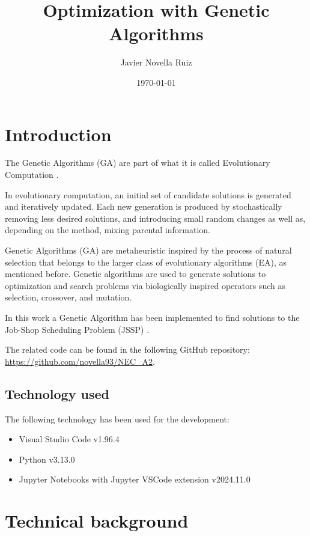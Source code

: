 \documentclass[11pt, a4paper]{article}
\title{Optimization with Genetic Algorithms}
\author{Javier Novella Ruiz}
\date{\today}
\begin{document}


\tableofcontents

\newpage

\section{Introduction}

The Genetic Algorithms (GA) \cite{WikipediaGA} are part of what it is called Evolutionary Computation \cite{WikipediaEC}.

\vspace{1em} In evolutionary computation, an initial set of candidate solutions is generated and iteratively updated. Each 
new generation is produced by stochastically removing less desired solutions, and introducing small random changes as well 
as, depending on the method, mixing parental information.

\vspace{1em} Genetic Algorithms (GA) are metaheuristic inspired by the process of natural selection that belongs to the larger 
class of evolutionary algorithms (EA), as mentioned before. Genetic algorithms are used to generate solutions to optimization 
and search problems via biologically inspired operators such as selection, crossover, and mutation.

\vspace{1em} In this work a Genetic Algorithm has been implemented to find solutions to the Job-Shop Scheduling Problem (JSSP)
\cite{WikipediaJSSP}.

\vspace{1em} The related code can be found in the following GitHub repository: \url{https://github.com/novella93/NEC_A2}.

\subsection{Technology used}

The following technology has been used for the development:

\begin{itemize}
    \item Visual Studio Code v1.96.4
    \item Python v3.13.0
    \item Jupyter Notebooks with Jupyter VSCode extension v2024.11.0
\end{itemize}

\section{Technical background}
\end{document}
